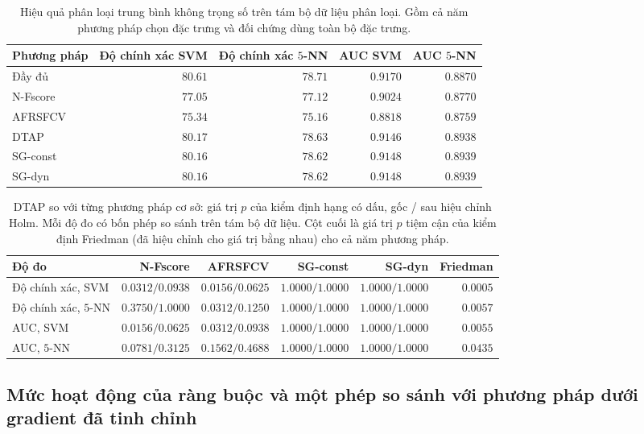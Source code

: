 \begin{table}[htbp]
\centering\small\setlength{\tabcolsep}{4pt}
\caption{Hiệu quả phân loại trung bình không trọng số trên tám bộ dữ liệu phân loại. Gồm cả năm phương pháp chọn đặc trưng và đối chứng dùng toàn bộ đặc trưng.}\label{tab:perf-summary}
\begin{tabular}{lrrrr}
\toprule
Phương pháp & Độ chính xác SVM & Độ chính xác $5$-NN & AUC SVM & AUC $5$-NN \\
\midrule
Đầy đủ & $80.61$ & $78.71$ & $0.9170$ & $0.8870$ \\
N-Fscore & $77.05$ & $77.12$ & $0.9024$ & $0.8770$ \\
AFRSFCV & $75.34$ & $75.16$ & $0.8818$ & $0.8759$ \\
DTAP & $80.17$ & $78.63$ & $0.9146$ & $0.8938$ \\
SG-const & $80.16$ & $78.62$ & $0.9148$ & $0.8939$ \\
SG-dyn & $80.16$ & $78.62$ & $0.9148$ & $0.8939$ \\
\bottomrule
\end{tabular}

\end{table}
\begin{table}[htbp]
\centering\footnotesize\setlength{\tabcolsep}{4pt}
\caption{DTAP so với từng phương pháp cơ sở: giá trị $p$ của kiểm định hạng có dấu, gốc / sau hiệu chỉnh Holm. Mỗi độ đo có bốn phép so sánh trên tám bộ dữ liệu. Cột cuối là giá trị $p$ tiệm cận của kiểm định Friedman (đã hiệu chỉnh cho giá trị bằng nhau) cho cả năm phương pháp.}\label{tab:wilcoxon}
\begin{tabular}{lrrrrr}
\toprule
Độ đo & N-Fscore & AFRSFCV & SG-const & SG-dyn & Friedman \\
\midrule
Độ chính xác, SVM & $0.0312/0.0938$ & $0.0156/0.0625$ & $1.0000/1.0000$ & $1.0000/1.0000$ & $0.0005$ \\
Độ chính xác, $5$-NN & $0.3750/1.0000$ & $0.0312/0.1250$ & $1.0000/1.0000$ & $1.0000/1.0000$ & $0.0057$ \\
AUC, SVM & $0.0156/0.0625$ & $0.0312/0.0938$ & $1.0000/1.0000$ & $1.0000/1.0000$ & $0.0055$ \\
AUC, $5$-NN & $0.0781/0.3125$ & $0.1562/0.4688$ & $1.0000/1.0000$ & $1.0000/1.0000$ & $0.0435$ \\
\bottomrule
\end{tabular}

\end{table}

\subsection{Mức hoạt động của ràng buộc và một phép so sánh với phương pháp dưới gradient đã tinh chỉnh}
\label{ssec:feasibility-audit}

